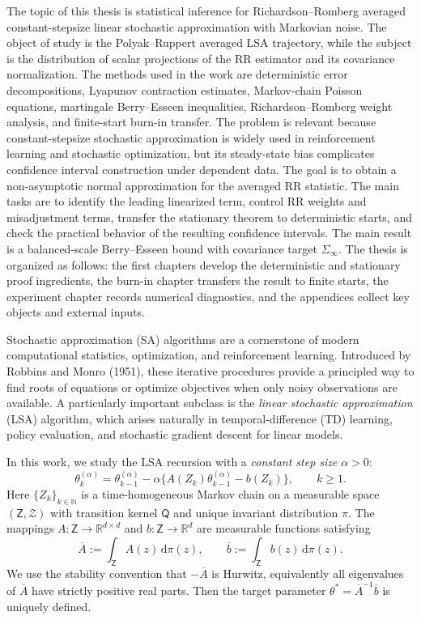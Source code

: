 The topic of this thesis is statistical inference for Richardson--Romberg
averaged constant-stepsize linear stochastic approximation with Markovian
noise. The object of study is the Polyak--Ruppert averaged LSA trajectory,
while the subject is the distribution of scalar projections of the RR
estimator and its covariance normalization. The methods used in the work are
deterministic error decompositions, Lyapunov contraction estimates,
Markov-chain Poisson equations, martingale Berry--Esseen inequalities,
Richardson--Romberg weight analysis, and finite-start burn-in transfer. The
problem is relevant because constant-stepsize stochastic approximation is
widely used in reinforcement learning and stochastic optimization, but its
steady-state bias complicates confidence interval construction under
dependent data. The goal is to obtain a non-asymptotic normal approximation
for the averaged RR statistic. The main tasks are to identify the leading
linearized term, control RR weights and misadjustment terms, transfer the
stationary theorem to deterministic starts, and check the practical behavior
of the resulting confidence intervals. The main result is a balanced-scale
Berry--Esseen bound with covariance target $\Sigma_\infty$. The thesis is
organized as follows: the first chapters develop the deterministic and
stationary proof ingredients, the burn-in chapter transfers the result to
finite starts, the experiment chapter records numerical diagnostics, and the
appendices collect key objects and external inputs.

Stochastic approximation (SA) algorithms are a cornerstone of modern
computational statistics, optimization, and reinforcement learning.
Introduced by Robbins and Monro (1951), these iterative procedures provide a
principled way to find roots of equations or optimize objectives when only
noisy observations are available. A particularly important subclass is the
\emph{linear stochastic approximation} (LSA) algorithm, which arises
naturally in temporal-difference (TD) learning, policy evaluation, and
stochastic gradient descent for linear models.

In this work, we study the LSA recursion with a \emph{constant step size}
$\alpha>0$:
\begin{equation}
  \theta_k^{(\alpha)}
  = \theta_{k-1}^{(\alpha)}
    - \alpha\bigl\{A(Z_k)\theta_{k-1}^{(\alpha)}-b(Z_k)\bigr\},
  \qquad k\geq 1.
  \label{eq:lsa}
\end{equation}
Here $\{Z_k\}_{k\in\mathbb{N}}$ is a time-homogeneous Markov chain on a
measurable space $(\mathsf{Z},\mathcal{Z})$ with transition kernel $\mathsf{Q}$
and unique invariant distribution $\pi$. The mappings
$A\colon\mathsf{Z}\to\mathbb{R}^{d\times d}$ and
$b\colon\mathsf{Z}\to\mathbb{R}^d$ are measurable functions satisfying
\[
  \overline{A}:=\int_{\mathsf{Z}}A(z)\,\mathrm{d}\pi(z),
  \qquad
  \overline{b}:=\int_{\mathsf{Z}}b(z)\,\mathrm{d}\pi(z).
\]
We use the stability convention that $-\overline{A}$ is Hurwitz, equivalently
all eigenvalues of $\overline{A}$ have strictly positive real parts. Then the
target parameter $\theta^*=\overline{A}^{-1}\overline{b}$ is uniquely defined.

